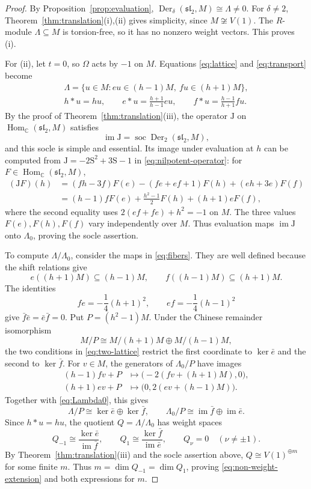 \documentclass[11pt,reqno]{amsart}
\numberwithin{equation}{section}
\newcommand{\C}{\mathbb C}
\newcommand{\s}{\mathfrak{sl}_2}
\DeclareMathOperator{\Der}{Der}
\DeclareMathOperator{\Hom}{Hom}
\DeclareMathOperator{\soc}{soc}
\DeclareMathOperator{\im}{im}
\theoremstyle{definition}
\theoremstyle{remark}
\begin{document}
\begin{proof}
By Proposition~\ref{prop:evaluation},
\(\Der_\delta(\s,M)\cong\Lambda\ne0\).
For \(\delta\ne2\), Theorem~\ref{thm:translation}(i),(ii)
gives simplicity, since \(M\not\cong V(1)\).
The \(R\)-module \(\Lambda\subseteq M\) is torsion-free, so it has
no nonzero weight vectors. This proves (i).

For (ii), let \(t=0\), so \(\Omega\) acts by \(-1\) on \(M\). Equations
\eqref{eq:lattice} and \eqref{eq:transport} become
\begin{equation}\label{eq:two-lattice}
\begin{gathered}
\Lambda=\{u\in M:eu\in(h-1)M,\ fu\in(h+1)M\},\\
h*u=hu,\qquad e*u=\frac{h+1}{h-1}eu,\qquad
f*u=\frac{h-1}{h+1}fu.
\end{gathered}
\end{equation}
By the proof of Theorem~\ref{thm:translation}(iii), the operator
\(\mathrm J\) on \(\Hom_\C(\s,M)\) satisfies
\[
\im\mathrm J=\soc\Der_2(\s,M),
\]
and this socle is simple and essential. Its image under evaluation
at \(h\) can be computed from
\(\mathrm J=-2\mathrm S^2+3\mathrm S-1\) in \eqref{eq:nilpotent-operator}:
for \(F\in\Hom_\C(\s,M)\),
\[
\begin{aligned}
(\mathrm JF)(h)
&=(fh-3f)F(e)-(fe+ef+1)F(h)+(eh+3e)F(f)\\
&=(h-1)fF(e)+\frac{h^2-1}{2}F(h)+(h+1)eF(f),
\end{aligned}
\]
where the second equality uses \(2(ef+fe)+h^2=-1\) on \(M\).
The three values \(F(e),F(h),F(f)\) vary independently over \(M\).
Thus evaluation maps \(\im\mathrm J\) onto \(\Lambda_0\),
proving the socle assertion.

To compute \(\Lambda/\Lambda_0\), consider the maps in
\eqref{eq:fibers}. They are well defined because the shift
relations give
\[
e((h+1)M)\subseteq(h-1)M,\qquad
f((h-1)M)\subseteq(h+1)M.
\]
The identities
\[
fe=-\frac{1}{4}(h+1)^2,\qquad ef=-\frac{1}{4}(h-1)^2
\]
give \(\bar f\bar e=\bar e\bar f=0\).
Put \(P=(h^2-1)M\). Under the Chinese remainder isomorphism
\[
M/P\cong M/(h+1)M\oplus M/(h-1)M,
\]
the two conditions in \eqref{eq:two-lattice} restrict the first
coordinate to \(\ker\bar e\) and the second to \(\ker\bar f\).
For \(v\in M\), the generators of \(\Lambda_0/P\) have images
\[
\begin{aligned}
(h-1)fv+P&\longmapsto\bigl(-2(fv+(h+1)M),0\bigr),\\
(h+1)ev+P&\longmapsto\bigl(0,2(ev+(h-1)M)\bigr).
\end{aligned}
\]
Together with \eqref{eq:Lambda0}, this gives
\[
\Lambda/P\cong\ker\bar e\oplus\ker\bar f,\qquad
\Lambda_0/P\cong\im\bar f\oplus\im\bar e.
\]
Since \(h*u=hu\), the quotient \(Q=\Lambda/\Lambda_0\) has
weight spaces
\[
Q_{-1}\cong\frac{\ker\bar e}{\im\bar f},\qquad
Q_1\cong\frac{\ker\bar f}{\im\bar e},\qquad
Q_\nu=0\quad(\nu\ne\pm1).
\]
By Theorem~\ref{thm:translation}(iii) and the socle assertion above,
\(Q\cong V(1)^{\oplus m}\) for some finite \(m\).
Thus \(m=\dim Q_{-1}=\dim Q_1\), proving
\eqref{eq:non-weight-extension} and both expressions for \(m\).


\end{proof}
\end{document}
